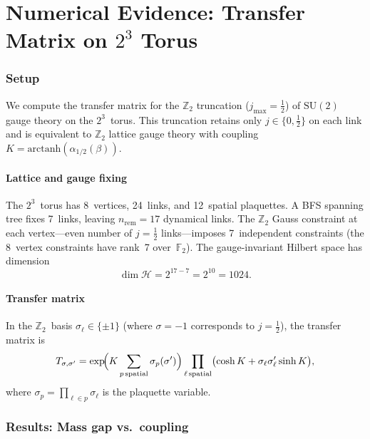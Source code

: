 \documentclass[12pt,a4paper]{article}
\newcommand{\Z}{\mathbb{Z}}
\newcommand{\F}{\mathbb{F}}
\newcommand{\half}{\tfrac{1}{2}}
\begin{document}
\part{Numerical Evidence: Transfer Matrix on $2^3$ Torus}

\section{Setup}\label{sec:num_setup}

We compute the transfer matrix for the $\Z_2$ truncation ($j_{\max}=\half$) of $\mathrm{SU}(2)$ gauge theory on the $2^3$~torus. This truncation retains only $j\in\{0,\half\}$ on each link and is equivalent to $\Z_2$ lattice gauge theory with coupling $K=\mathrm{arctanh}(\alpha_{1/2}(\beta))$.

\subsection{Lattice and gauge fixing}

The $2^3$~torus has 8~vertices, 24~links, and 12~spatial plaquettes. A BFS spanning tree fixes 7~links, leaving $n_{\mathrm{rem}}=17$ dynamical links. The $\Z_2$ Gauss constraint at each vertex---even number of $j{=}\half$ links---imposes 7~independent constraints (the 8~vertex constraints have rank~7 over~$\F_2$). The gauge-invariant Hilbert space has dimension
\begin{equation}
\dim\mathcal{H} = 2^{17-7} = 2^{10} = 1024.
\end{equation}

\subsection{Transfer matrix}

In the $\Z_2$~basis $\sigma_\ell\in\{\pm 1\}$ (where $\sigma=-1$ corresponds to $j=\half$), the transfer matrix is
\begin{equation}
T_{\sigma,\sigma'} = \exp\!\Bigl(K\sum_{p\,\mathrm{spatial}}\sigma_p(\sigma')\Bigr)\prod_{\ell\,\mathrm{spatial}}\bigl(\cosh K + \sigma_\ell\sigma_\ell'\sinh K\bigr),
\end{equation}
where $\sigma_p=\prod_{\ell\in p}\sigma_\ell$ is the plaquette variable.

\section{Results: Mass gap vs.\ coupling}\label{sec:results}
\end{document}

